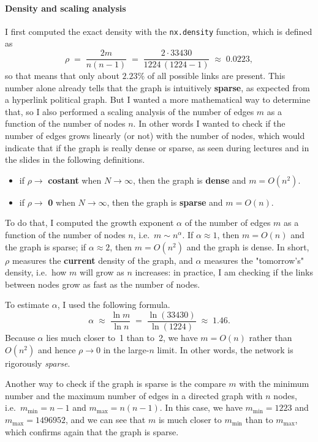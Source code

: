 \documentclass{article}
\begin{document}
\paragraph{Density and scaling analysis}
I first computed the exact density with the \texttt{nx.density} function, which is defined as
\[
\rho \;=\;\frac{2m}{n(n-1)}
\;=\;
\frac{2\cdot 33430}{1224\,(1224-1)}
\;\approx\;0.0223,
\]
so that means that only about $2.23\%$ of all possible links are present. This number alone already tells that the graph is intuitively \textbf{sparse}, as expected from a hyperlink political graph. But I wanted a more mathematical way to determine that, so I also performed a scaling analysis of the number of edges $m$ as a function of the number of nodes $n$. In other words I wanted to check if the number of edges grows linearly (or not) with the number of nodes, which would indicate that if the graph is really dense or sparse, as seen during lectures and in the slides in the following definitions.

\begin{itemize}
  \item if $\rho \to$ \textbf{costant} when $N\to\infty$, then the graph is \textbf{dense} and $m=O(n^2)$.
  \item if $\rho \to$ \textbf{0} when $N\to\infty$, then the graph is \textbf{sparse} and $m=O(n)$.
\end{itemize}

To do that, I computed the growth exponent $\alpha$ of the number of edges $m$ as a function of the number of nodes $n$, i.e.\ $m\sim n^\alpha$.  If $\alpha\approx1$, then $m=O(n)$ and the graph is sparse; if $\alpha\approx2$, then $m=O(n^2)$ and the graph is dense. In short, $\rho$ measures the \textbf{current} density of the graph, and $\alpha$ measures the "tomorrow's" density, i.e.\ how $m$ will grow as $n$ increases: in practice, I am checking if the links between nodes grow as fast as the number of nodes.

To estimate $\alpha$, I used the following formula.
\[
\alpha \;\approx\;\frac{\ln m}{\ln n}
\;=\;
\frac{\ln(33430)}{\ln(1224)}
\;\approx\;1.46.
\]
Because $\alpha$ lies much closer to~1 than to~2, we have $m=O(n)$ rather than $O(n^2)$ and hence $\rho\to0$ in the large-$n$ limit.  In other words, the network is rigorously \emph{sparse}. 

Another way to check if the graph is sparse is the compare $m$ with the minimum number and the maximum number of edges in a directed graph with $n$ nodes, i.e.\ $m_{\min}=n-1$ and $m_{\max}=n(n-1)$.  In this case, we have $m_{\min} = 1223$ and $m_{\max} = 1496952$, and we can see that $m$ is much closer to $m_{\min}$ than to $m_{\max}$, which confirms again that the graph is sparse.
\end{document}
